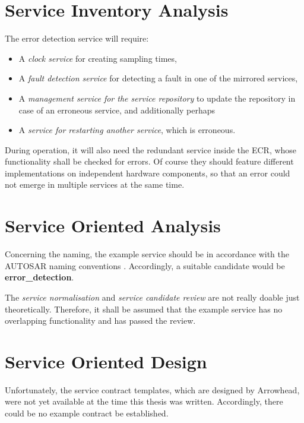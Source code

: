 \section{Service Inventory Analysis}


The error detection service will require:
\begin{itemize}
\item A \emph{clock service} for creating sampling times,
\item A \emph{fault detection service} for detecting a fault in one of the mirrored services,
\item A \emph{management service for the service repository} to update the repository in case of an erroneous service, and additionally perhaps
\item A \emph{service for restarting another service}, which is erroneous.
\end{itemize}

During operation, it will also need the redundant service inside the ECR, whose functionality shall be checked for errors. Of course they should feature different implementations on independent hardware components, so that an error could not emerge in multiple services at the same time.


\section{Service Oriented Analysis}


Concerning the naming, the example service should be in accordance with the AUTOSAR naming conventions \cite{autosar_system_modelling}. Accordingly, a suitable candidate would be \textbf{error\_detection}.

The \emph{service normalisation} and \emph{service candidate review} are not really doable just theoretically. Therefore, it shall be assumed that the example service has no overlapping functionality and has passed the review.





\section{Service Oriented Design}

Unfortunately, the service contract templates, which are designed by Arrowhead, were not yet available at the time this thesis was written. Accordingly, there could be no example contract be established.



